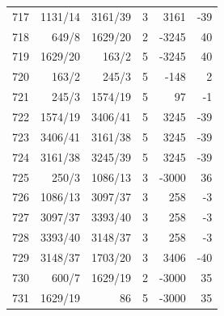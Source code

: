 \documentclass[11pt,a4paper]{article}
\begin{document}
\begin{minipage}[t]{.49\linewidth}
\begin{tabular*}{\linewidth}{@{}r@{\extracolsep{\fill}}rrrrr@{}}
717 & 1131/14 & 3161/39 & 3 & 3161 & -39\\
718 & 649/8 & 1629/20 & 2 & -3245 & 40\\
719 & 1629/20 & 163/2 & 5 & -3245 & 40\\
720 & 163/2 & 245/3 & 5 & -148 & 2\\
721 & 245/3 & 1574/19 & 5 & 97 & -1\\
722 & 1574/19 & 3406/41 & 5 & 3245 & -39\\
723 & 3406/41 & 3161/38 & 5 & 3245 & -39\\
724 & 3161/38 & 3245/39 & 5 & 3245 & -39\\
725 & 250/3 & 1086/13 & 3 & -3000 & 36\\
726 & 1086/13 & 3097/37 & 3 & 258 & -3\\
727 & 3097/37 & 3393/40 & 3 & 258 & -3\\
728 & 3393/40 & 3148/37 & 3 & 258 & -3\\
729 & 3148/37 & 1703/20 & 3 & 3406 & -40\\
730 & 600/7 & 1629/19 & 2 & -3000 & 35\\
731 & 1629/19 & 86 & 5 & -3000 & 35\\
\bottomrule\end{tabular*}\end{minipage}\hfill
\end{document}
